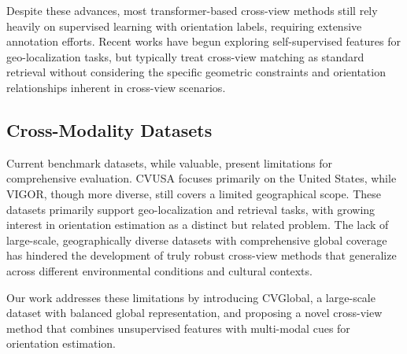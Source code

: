 \documentclass{bmvc2k}
\begin{document}
Despite these advances, most transformer-based cross-view methods still rely heavily on supervised learning with orientation labels, requiring extensive annotation efforts. Recent works have begun exploring self-supervised features for geo-localization tasks, but typically treat cross-view matching as standard retrieval without considering the specific geometric constraints and orientation relationships inherent in cross-view scenarios.



\subsection{Cross-Modality Datasets}

Current benchmark datasets, while valuable, present limitations for comprehensive evaluation. CVUSA focuses primarily on the United States, while VIGOR, though more diverse, still covers a limited geographical scope. These datasets primarily support geo-localization and retrieval tasks, with growing interest in orientation estimation as a distinct but related problem. The lack of large-scale, geographically diverse datasets with comprehensive global coverage has hindered the development of truly robust cross-view methods that generalize across different environmental conditions and cultural contexts.

Our work addresses these limitations by introducing CVGlobal, a large-scale dataset with balanced global representation, and proposing a novel cross-view method that combines unsupervised features with multi-modal cues for orientation estimation.
\end{document}
